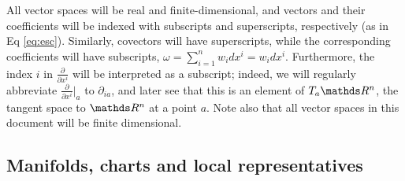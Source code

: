 % 
All vector spaces will be real and finite-dimensional, and vectors and their coefficients will be indexed with subscripts and superscripts, respectively (as in Eq \eqref{eq:esc}). Similarly, covectors will have superscripts, while the corresponding coefficients will have subscripts, $\omega  = \sum_{i = 1}^n w_i dx^i = w_i dx^i$. Furthermore, the index $i$ in $\frac{\partial}{\partial x^i}$ will be interpreted as a subscript; indeed, we will regularly abbreviate $\frac{\partial}{\partial x^i}\bigr|_a$ to $\partial_{ia}$, and later see that this is an element of $T_a\R^n$, the tangent space to $\R^n$ at a point $a$. Note also that all vector spaces in this document will be finite dimensional. 

\subsection{Manifolds, charts and local representatives}



